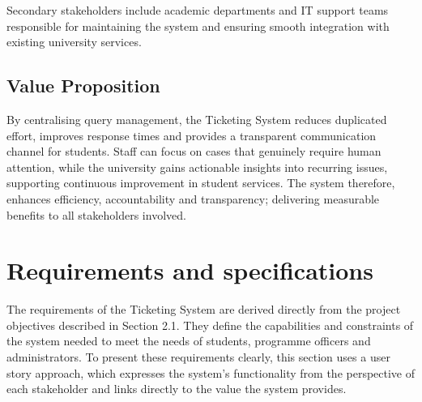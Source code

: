 Secondary stakeholders include academic departments and IT support teams responsible for maintaining the system and ensuring smooth integration with existing university services.

\subsection{Value Proposition}

By centralising query management, the Ticketing System reduces duplicated effort, improves response times and provides a transparent communication channel for students. Staff can focus on cases that genuinely require human attention, while the university gains actionable insights into recurring issues, supporting continuous improvement in student services. The system therefore, enhances efficiency, accountability and transparency; delivering measurable benefits to all stakeholders involved.

\section{Requirements and specifications}
\label{sect:requirements}
The requirements of the Ticketing System are derived directly from the project objectives described in Section 2.1. They define the capabilities and constraints of the system needed to meet the needs of students, programme officers and administrators. To present these requirements clearly, this section uses a user story approach, which expresses the system’s functionality from the perspective of each stakeholder and links directly to the value the system provides.

